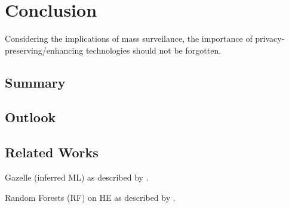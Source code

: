 \chapter{Conclusion}
\label{chap:conclusion}

Considering the implications of mass surveilance, the importance of privacy-preserving/enhancing technologies should not be forgotten.

\section{Summary}


\section{Outlook}

\section{Related Works}
Gazelle (inferred ML) as described by \cite{2018-gazelle}.

Random Forests (RF) on HE as described by \cite{2020-cryptotree}.
